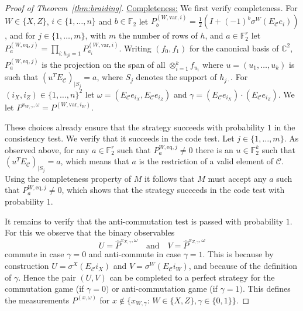 \documentclass[11pt]{article}
\theoremstyle{definition}
\newcommand{\code}{\mathscr{C}}
\newcommand{\Id}{\ensuremath{I}}
\newcommand{\field}{\mathbb{F}_2}
\newcommand{\C}{\ensuremath{\mathbb{C}}}
\newcommand{\F}{\ensuremath{\mathbb{F}}}
\newcommand{\eq}{\mathrm{eq}}
\newcommand{\var}{\mathrm{var}}
\begin{document}
\begin{proof}[Proof of Theorem~\ref{thm:braiding}]
\underline{Completeness:} We first verify completeness. For $W\in\{X,Z\}$, $i\in\{1,\ldots,n\}$ and $b\in \F_2$ let $P^{(W,\var,i)}_b = \frac{1}{2}(\Id + (-1)^b\sigma^W(E_\code e_i))$, and for $j\in\{1,\ldots,m\}$, with $m$ the number of rows of $h$, and $a\in \F_2^r$ let $P^{(W,\eq,j)}_a = \prod_{i: h_{ji}=1} P^{(W,\var,i)}_{a_i}$. Writing $(f_0,f_1)$ for the canonical basis of $\C^2$, $P^{(W,\eq,j)}_a$ is the projection on the span of all $\otimes_{i=1}^k f_{u_i}$ where $u=(u_1,\ldots,u_k)$ is such that $(u^T E_\code)_{|S_j}=a$, where $S_j$ denotes the support of $h_{j\cdot}$.   
For $(i_X,i_Z)\in \{1,\ldots,n\}^2 $ let $\omega=(E_\code e_{i_X}, E_\code e_{i_Z})$ and $\gamma =(E_\code e_{i_X}) \cdot(E_\code e_{i_Z}) $. We let $P^{x_{W,\gamma},\omega} = P^{(W,\var,i_W)}$. 

These choices already ensure that the strategy succeeds with probability $1$ in the consistency test. We verify that it succeeds in the code test. Let $j\in\{1,\ldots,m\}$. As observed above, for any $a\in\field^r$ such that $P^{W,\eq,j}_a\neq 0$ there is an $u\in \field^k$ such that $(u^TE_\code)_{|S_j}=a$, which means that $a$ is the restriction of a valid element of $\code$. 
Using the completeness property of $M$ it follows that $M$ must accept any $a$ such that $P^{W,\eq,j}_a\neq 0$, which shows that the strategy succeeds in the code test with probability $1$. 

It remains to verify that the anti-commutation test is passed with probability $1$. For this we observe that 
the binary observables 
\[ U=\widehat{ P}^{x_{X,\gamma},\omega} \quad\text{and}\quad V= \widehat{P}^{x_{Z,\gamma},\omega} \]
commute in case $\gamma=0$ and anti-commute in case $\gamma=1$. This is because by construction $U=\sigma^X(E_\code i_X)$ and $V=\sigma^W(E_\code i_W)$, and because of the definition of $\gamma$. Hence the pair $(U,V)$ can be completed to a perfect strategy for the commutation game (if $\gamma=0)$ or anti-commutation game (if $\gamma=1)$. This defines the measurements $P^{(x,\omega)}$ for $x\notin \{x_{W,\gamma}:\,W\in\{X,Z\},\gamma\in\{0,1\}\}$. 


\end{proof}
\end{document}
